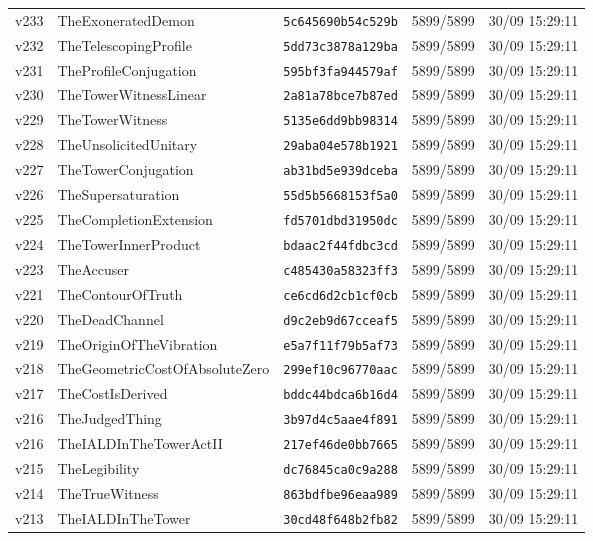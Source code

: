 \documentclass[11pt]{article}
\theoremstyle{definition}\newtheorem{deriv}{Derivação}
\begin{document}
{\begin{longtable}{@{}lllll@{}}
v233 & TheExoneratedDemon & \texttt{5c645690b54c529b} & 5899/5899 & 30/09 15:29:11 \\
v232 & TheTelescopingProfile & \texttt{5dd73c3878a129ba} & 5899/5899 & 30/09 15:29:11 \\
v231 & TheProfileConjugation & \texttt{595bf3fa944579af} & 5899/5899 & 30/09 15:29:11 \\
v230 & TheTowerWitnessLinear & \texttt{2a81a78bce7b87ed} & 5899/5899 & 30/09 15:29:11 \\
v229 & TheTowerWitness & \texttt{5135e6dd9bb98314} & 5899/5899 & 30/09 15:29:11 \\
v228 & TheUnsolicitedUnitary & \texttt{29aba04e578b1921} & 5899/5899 & 30/09 15:29:11 \\
v227 & TheTowerConjugation & \texttt{ab31bd5e939dceba} & 5899/5899 & 30/09 15:29:11 \\
v226 & TheSupersaturation & \texttt{55d5b5668153f5a0} & 5899/5899 & 30/09 15:29:11 \\
v225 & TheCompletionExtension & \texttt{fd5701dbd31950dc} & 5899/5899 & 30/09 15:29:11 \\
v224 & TheTowerInnerProduct & \texttt{bdaac2f44fdbc3cd} & 5899/5899 & 30/09 15:29:11 \\
v223 & TheAccuser & \texttt{c485430a58323ff3} & 5899/5899 & 30/09 15:29:11 \\
v221 & TheContourOfTruth & \texttt{ce6cd6d2cb1cf0cb} & 5899/5899 & 30/09 15:29:11 \\
v220 & TheDeadChannel & \texttt{d9c2eb9d67cceaf5} & 5899/5899 & 30/09 15:29:11 \\
v219 & TheOriginOfTheVibration & \texttt{e5a7f11f79b5af73} & 5899/5899 & 30/09 15:29:11 \\
v218 & TheGeometricCostOfAbsoluteZero & \texttt{299ef10c96770aac} & 5899/5899 & 30/09 15:29:11 \\
v217 & TheCostIsDerived & \texttt{bddc44bdca6b16d4} & 5899/5899 & 30/09 15:29:11 \\
v216 & TheJudgedThing & \texttt{3b97d4c5aae4f891} & 5899/5899 & 30/09 15:29:11 \\
v216 & TheIALDInTheTowerActII & \texttt{217ef46de0bb7665} & 5899/5899 & 30/09 15:29:11 \\
v215 & TheLegibility & \texttt{dc76845ca0c9a288} & 5899/5899 & 30/09 15:29:11 \\
v214 & TheTrueWitness & \texttt{863bdfbe96eaa989} & 5899/5899 & 30/09 15:29:11 \\
v213 & TheIALDInTheTower & \texttt{30cd48f648b2fb82} & 5899/5899 & 30/09 15:29:11 \\

\end{longtable}}
\end{document}
